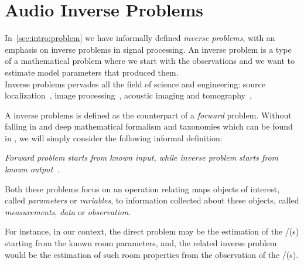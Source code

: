 \section{Audio Inverse Problems}
\cite{kitic2015cosparse}
In~\cref{sec:intro:problem} we have informally defined \textit{inverse problems}, with an emphasis on inverse problems in signal processing.
An inverse problem is a type of a mathematical problem where we start with the observations and we want to estimate model parameters that produced them.
\\Inverse problems pervades all the field of science and engineering:
source localization~\cite{},
image processing~\cite{},
acoustic imaging and tomography~\cite{},

A inverse problems is defined as the counterpart of a \textit{forward} problem.
Without falling in and deep mathematical formalism and taxonomies which can be found in ,
we will simply consider the following informal definition:
\begin{center}
    \textit{\emph{Forward problem} starts from known input, while \emph{inverse problem} starts from known output~\cite{santamarina2005discrete}.}
\end{center}
Both these problems focus on an operation relating maps objects of interest, called \textit{parameters} or \textit{variables},
to information collected about these objects, called \textit{measurements}, \textit{data} or \textit{observation}.

For instance, in our context, the direct problem may be the estimation of the \RIR/(s) starting from the known room parameters,
and, the related inverse problem would be the estimation of such room properties from the observation of the \RIR/(s).

